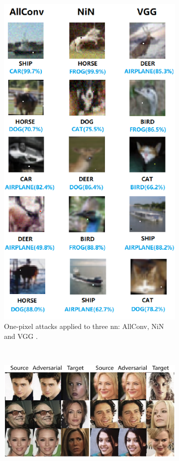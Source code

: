 \begin{figure}[p]
\begin{subfigure}[b]{0.4\linewidth}
    \includegraphics[width=\linewidth]{adversarial-one-pixel}
    \caption{One-pixel attacks applied to three \gls{nn}: AllConv, NiN and VGG \citep{Su:2017uw}.}
  \end{subfigure}
  \\ \bigskip
  \begin{subfigure}[b]{0.8\linewidth}
    \centering
    \includegraphics[width=\linewidth]{adversarial-celebrities}

\end{subfigure}
\end{figure}
